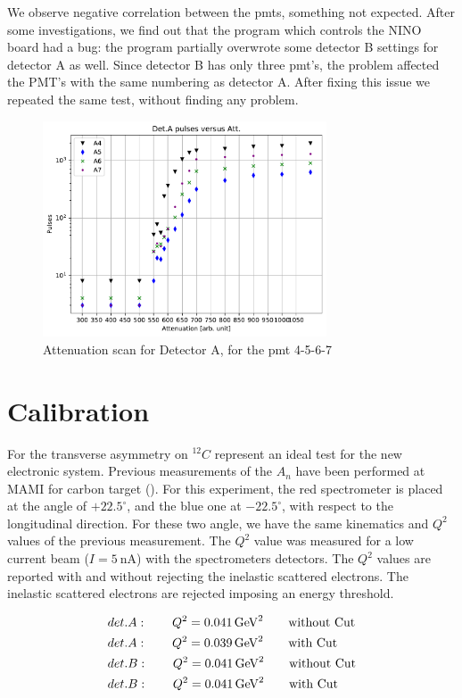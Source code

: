 We observe negative correlation between the pmts, something not expected. After some investigations, we find out that the program which controls the NINO board had a bug: the program partially overwrote some detector B settings for detector A as well. Since detector B has only three pmt's, the problem affected the PMT's with the same numbering as detector A. After fixing this issue we repeated the same test, without finding any problem. 

\begin{figure}[!htb]
\centering
\includegraphics[width = 0.75\textwidth]{Analysis/AttenuationA(4-7).pdf}
\caption{Attenuation scan for Detector A, for the pmt 4-5-6-7}
\label{fig:ScatDetA}
\end{figure}

\newpage
\section{Calibration}

For the transverse asymmetry on $^{12}C$ represent an ideal test for the new electronic system. Previous measurements of the $A_{n}$ have been performed at MAMI for carbon target (\cite{Esser:2018vdp}). For this experiment, the red spectrometer is placed at the angle of $+22.5^{\circ}$, and the blue one at $-22.5^{\circ}$, with respect to the longitudinal direction. For these two angle, we have the same kinematics and $Q^{2}$ values of the previous measurement. The $Q^{2}$ value was measured for a low current beam ($I = \SI{5}{\nano \ampere}$) with the spectrometers detectors. The $Q^{2}$ values are reported with and without rejecting the inelastic scattered electrons. The inelastic scattered electrons are rejected imposing an energy threshold. 

\begin{flushleft}
\begin{align*}
& det. A : \qquad Q^{2} = \SI{0.041}{\giga \electronvolt \squared} \qquad \textnormal{without Cut} \\
& det. A : \qquad Q^{2} = \SI{0.039}{\giga \electronvolt \squared} \qquad \textnormal{with Cut} \\
& det. B : \qquad Q^{2} = \SI{0.041}{\giga \electronvolt \squared} \qquad \textnormal{without Cut} \\
& det. B : \qquad Q^{2} = \SI{0.041}{\giga \electronvolt \squared} \qquad \textnormal{with Cut} 
\end{align*} 
\end{flushleft}

